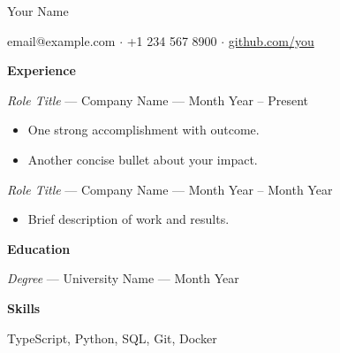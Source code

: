 \documentclass[11pt,a4paper]{article}
\begin{document}
{\LARGE Your Name}

{\small
email@example.com $\cdot$
+1 234 567 8900 $\cdot$
\href{https://github.com/}{github.com/you}}

\vspace{4pt}

\textbf{Experience}

\textit{Role Title} --- Company Name --- Month Year -- Present
\begin{itemize}
  \item One strong accomplishment with outcome.
  \item Another concise bullet about your impact.
\end{itemize}

\textit{Role Title} --- Company Name --- Month Year -- Month Year
\begin{itemize}
  \item Brief description of work and results.
\end{itemize}

\textbf{Education}

\textit{Degree} --- University Name --- Month Year

\textbf{Skills}

TypeScript, Python, SQL, Git, Docker
\end{document}
